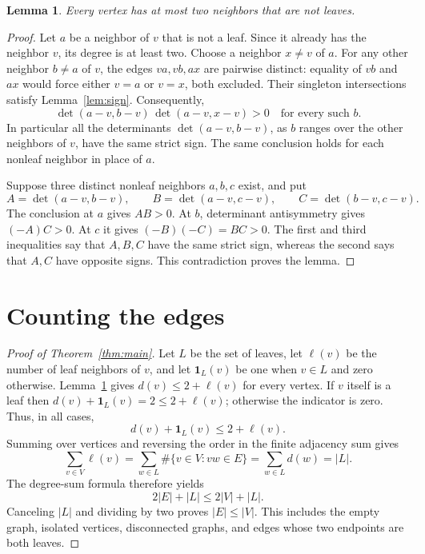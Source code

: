 \documentclass[11pt]{article}
\newtheorem{lemma}[theorem]{Lemma}
\newcommand{\detp}[2]{\det\!\left(#1,#2\right)}
\begin{document}
\begin{lemma}\label{lem:two}
Every vertex has at most two neighbors that are not leaves.
\end{lemma}

\begin{proof}
Let $a$ be a neighbor of $v$ that is not a leaf. Since it already has the
neighbor $v$, its degree is at least two. Choose a neighbor $x\ne v$ of
$a$. For any other neighbor $b\ne a$ of $v$, the edges $va,vb,ax$ are
pairwise distinct: equality of $vb$ and $ax$ would force either $v=a$ or
$v=x$, both excluded. Their singleton intersections satisfy
Lemma~\ref{lem:sign}. Consequently,
\[
 \detp{a-v}{b-v}\,\detp{a-v}{x-v}>0
 \quad\text{for every such }b.
\]
In particular all the determinants $\detp{a-v}{b-v}$, as $b$ ranges over
the other neighbors of $v$, have the same strict sign. The same conclusion
holds for each nonleaf neighbor in place of $a$.

Suppose three distinct nonleaf neighbors $a,b,c$ exist, and put
\[
 A=\detp{a-v}{b-v},\qquad
 B=\detp{a-v}{c-v},\qquad
 C=\detp{b-v}{c-v}.
\]
The conclusion at $a$ gives $AB>0$. At $b$, determinant antisymmetry
gives $(-A)C>0$. At $c$ it gives $(-B)(-C)=BC>0$. The first and third
inequalities say that $A,B,C$ have the same strict sign, whereas the
second says that $A,C$ have opposite signs. This contradiction proves the
lemma.
\end{proof}

\section{Counting the edges}
\begin{proof}[Proof of Theorem~\ref{thm:main}]
Let $L$ be the set of leaves, let $\ell(v)$ be the number of leaf
neighbors of $v$, and let $\mathbf1_L(v)$ be one when $v\in L$ and zero
otherwise. Lemma~\ref{lem:two} gives
$d(v)\leq2+\ell(v)$ for every vertex. If $v$ itself is a leaf then
$d(v)+\mathbf1_L(v)=2\leq2+\ell(v)$; otherwise the indicator is zero.
Thus, in all cases,
\[
 d(v)+\mathbf1_L(v)\leq2+\ell(v).
\]
Summing over vertices and reversing the order in the finite adjacency
sum gives
\[
 \sum_{v\in V}\ell(v)
 =\sum_{w\in L}\#\{v\in V:vw\in E\}
 =\sum_{w\in L}d(w)=|L|.
\]
The degree-sum formula therefore yields
\[
 2|E|+|L|\leq2|V|+|L|.
\]
Canceling $|L|$ and dividing by two proves $|E|\leq|V|$. This includes
the empty graph, isolated vertices, disconnected graphs, and edges whose
two endpoints are both leaves.
\end{proof}
\end{document}
